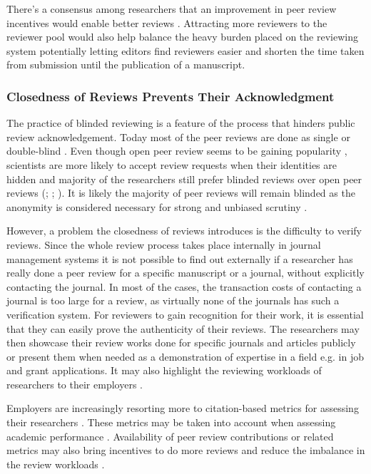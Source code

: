 There’s a consensus among researchers that an improvement in peer review incentives would enable better reviews \parencite{Publons.2018}. Attracting more reviewers to the reviewer pool would also help balance the heavy burden placed on the reviewing system potentially letting editors find reviewers easier and shorten the time taken from submission until the publication of a manuscript. 

\subsubsection{Closedness of Reviews Prevents Their Acknowledgment}

The practice of blinded reviewing is a feature of the process that hinders public review acknowledgement. Today most of the peer reviews are done as single or double-blind \parencite{Wolfram.2020}. Even though open peer review seems to be gaining popularity \parencite{Wolfram.2020}, scientists are more likely to accept review requests when their identities are hidden \parencite{vanRooyen.1999} and majority of the researchers still prefer blinded reviews over open peer reviews (\cite[149]{Mulligan.2013}; \cite{Taylor&Francis.2015}; \cite[1038-1039]{Wolfram.2020}). It is likely the majority of peer reviews will remain blinded as the anonymity is considered necessary for strong and unbiased scrutiny \parencite[21-23]{RossHellauer.2017}.

However, a problem the closedness of reviews introduces is the difficulty to verify reviews. Since the whole review process takes place internally in journal management systems it is not possible to find out externally if a researcher has really done a peer review for a specific manuscript or a journal, without explicitly contacting the journal. In most of the cases, the transaction costs of contacting a journal is too large for a review, as virtually none of the journals has such a verification system. For reviewers to gain recognition for their work, it is essential that they can easily prove the authenticity of their reviews. The researchers may then showcase their review works done for specific journals and articles publicly or present them when needed as a demonstration of expertise in a field e.g. in job and grant applications. It may also highlight the reviewing workloads of researchers to their employers \parencite[2]{Raoult.2020}. 

Employers are increasingly resorting more to citation-based metrics for assessing their researchers \parencite{Bianchi.2019, Cantor.2015, Kachewar.2013, Verissimo.2013}. These metrics may be taken into account when assessing academic performance \parencite[11]{Ferreira.2016}. Availability of peer review contributions or related metrics may also bring incentives to do more reviews and reduce the imbalance in the review workloads \parencite[4]{Petchey.2014}. 

